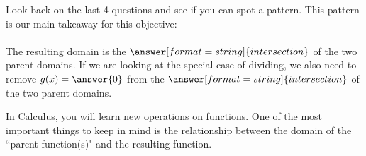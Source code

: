 \documentclass{ximera}
\begin{document}
\begin{problem}
Look back on the last 4 questions and see if you can spot a pattern. This pattern is our main takeaway for this objective: \\ \\
 
The resulting domain is the $\answer[format=string]{intersection}$ of the two parent domains. If we are looking at the special case of dividing, we also need to remove $g(x) = \answer{0}$ from the $\answer[format=string]{intersection}$ of the two parent domains.
 
\begin{feedback}[correct]
In Calculus, you will learn new operations on functions. One of the most important things to keep in mind is the relationship between the domain of the ``parent function(s)" and the resulting function.
\end{feedback}
 
\end{problem}
 
\end{document}

